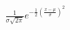\documentclass[preview]{standalone}
\begin{document}
\begin{align*}
\frac{1}{\sigma \sqrt{2 \pi}} e^{-\frac{1}{2}\left(\frac{x-\mu}{\sigma}\right)^2}
\end{align*}
\end{document}
